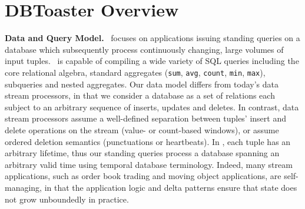 \section{DBToaster Overview}

\noindent\textbf{Data and Query Model.}
\compiler\ focuses on applications issuing standing queries on a database which
subsequently process continuously changing, large volumes of input tuples.
\compiler\ is capable of compiling a wide variety of SQL queries including the
core relational algebra, standard aggregates (\texttt{sum}, \texttt{avg},
\texttt{count}, \texttt{min}, \texttt{max}), subqueries and nested aggregates.
Our data model differs from today's data stream processors, in that we consider a
database as a set of relations each subject to an arbitrary sequence of inserts,
updates and deletes. In contrast, data stream processors assume a well-defined
separation between tuples' insert and delete operations on the stream (value- or
count-based windows), or assume ordered deletion semantics (punctuations or
heartbeats). In \compiler, each tuple has an arbitrary lifetime, thus our
standing queries process a database spanning an arbitrary valid time using
temporal database terminology. Indeed, many stream applications, such as
order book trading and moving object applications, are self-managing, in that the
application logic and delta patterns ensure that state does not grow unboundedly in
practice.


